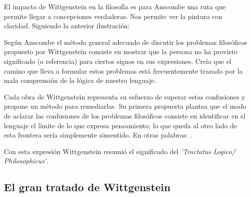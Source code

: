 El impacto de Wittgenstein en la filosofía es para Anscombe una ruta que permite
llegar a concepciones verdaderas. Nos permite ver la pintura con claridad.
Siguiendo la anterior ilustración:


Según Anscombe el método general adecuado de discutir los problemas filosóficos
propuesto por Wittgenstein consiste en mostrar que la persona no ha provisto
significado (o referencia) para ciertos signos en sus expresiones.\autocite[cf.
p. 151]{IWT} Creía que el camino que lleva a formular estos problemas está
frecuentemente trazado por la mala comprensión de la lógica de nuestro lenguaje.

Cada obra de Wittgenstein representa su esfuerzo de superar estas confusiones y
propone un método para remediarlas. Su primera propuesta plantea que el modo de
aclarar las confusiones de los problemas filosóficos consiste en identificar en
el lenguaje el límite de lo que expresa pensamiento; lo que queda al otro lado
de esta frontera sería simplemente sinsentido. En otras palabras:
.\autocite[prefacio]{tractatus}

Con esta expresión Wittgenstein resumió el significado del \emph{'Tractatus
Logico\=/Philosophicus'}.

\subsection{El gran tratado de Wittgenstein}


